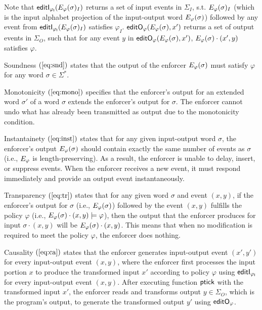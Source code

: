 Note that $\mathsf{editI_{\varphi_I}}(E_{\varphi}(\sigma)_I)$ returns a set of input events in $\Sigma_I$, s.t. $E_{\varphi}(\sigma)_I$  (which is the input alphabet projection of the input-output word $E_{\varphi}(\sigma)$)  followed by any event from $\mathsf{editI_{\varphi_I}}(E_{\varphi}(\sigma)_I)$ satisfies $\varphi_I$.
$\mathsf{editO_{\varphi}}(E_{\varphi}(\sigma), x')$ returns a set of output events in $\Sigma_O$, such that for any event $y$ in $\mathsf{editO_{\varphi}}(E_{\varphi}(\sigma), x')$, $E_{\varphi}(\sigma)\cdot(x',y)$ satisfies $\varphi$.
%
\squishlist
\item Soundness $(\ref{eq:snd})$ states that the output of the enforcer $E_{\varphi}(\sigma)$ must satisfy $\varphi$ for any word $\sigma\in\Sigma^*$.
\item Monotonicity $(\ref{eq:mono})$ specifies that the enforcer's output for an extended word $\sigma'$ of a word $\sigma$ extends the enforcer's output for $\sigma$.
The enforcer cannot undo what has already been transmitted as output due to the monotonicity condition.
\item Instantainety $(\ref{eq:inst})$  states that for any given input-output word $\sigma$, the enforcer's output $E_{\varphi}(\sigma)$ should contain exactly the same number of events as $\sigma$ (i.e., $E_{\varphi}$ is length-preserving).
As a result, the enforcer is unable to delay, insert, or suppress events.
When the enforcer receives a new event, it must respond immediately and provide an output event instantaneously.
\item
Transparency $(\ref{eq:tr})$ states that for any given word $\sigma$ and event $(x,y)$, if the enforcer's output for $\sigma$ (i.e., $E_{\varphi}(\sigma)$) followed by the event $(x,y)$ fulfills the policy $\varphi$ (i.e., $E_{\varphi}(\sigma)\cdot(x,y) \models \varphi$), then the output that the enforcer produces for input $\sigma\cdot(x,y)$ will be $E_{\varphi}(\sigma)\cdot(x,y)$.
This means that when no modification is required to meet the policy $\varphi$, the enforcer does nothing.
%
\item Causality $(\ref{eq:ca})$  states that the enforcer generates input-output event $(x',y')$ for every input-output event $(x,y)$, where the enforcer first processes the input portion $x$ to produce the transformed input $x'$ according to policy $\varphi$ using $\mathsf{editI_{\varphi_I}}$ for every input-output event $(x,y)$.
After executing function $\mathsf{ptick}$ with the transformed input $x'$, the enforcer reads and transforms output $y\in \Sigma_O$, which is the program's output, to generate the transformed output $y'$ using $\mathsf{editO_{\varphi}}$.
\squishend
